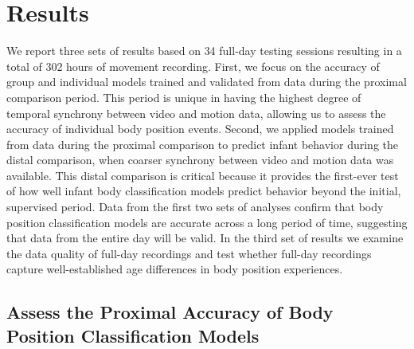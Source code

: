 \documentclass[
  man]{apa6}
\begin{document}
\hypertarget{results}{%
\section{Results}\label{results}}

We report three sets of results based on 34 full-day testing sessions resulting in a total of 302 hours of movement recording. First, we focus on the accuracy of group and individual models trained and validated from data during the proximal comparison period. This period is unique in having the highest degree of temporal synchrony between video and motion data, allowing us to assess the accuracy of individual body position events. Second, we applied models trained from data during the proximal comparison to predict infant behavior during the distal comparison, when coarser synchrony between video and motion data was available. This distal comparison is critical because it provides the first-ever test of how well infant body classification models predict behavior beyond the initial, supervised period. Data from the first two sets of analyses confirm that body position classification models are accurate across a long period of time, suggesting that data from the entire day will be valid. In the third set of results we examine the data quality of full-day recordings and test whether full-day recordings capture well-established age differences in body position experiences.

\hypertarget{assess-the-proximal-accuracy-of-body-position-classification-models}{%
\subsection{Assess the Proximal Accuracy of Body Position Classification Models}\label{assess-the-proximal-accuracy-of-body-position-classification-models}}
\end{document}
